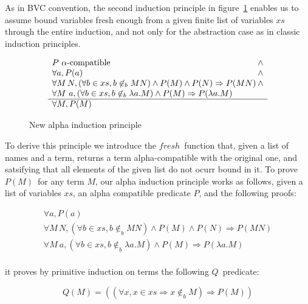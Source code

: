 \documentclass[preprint,10pt]{sigplanconf}
\newcommand{\lam}{\ensuremath{\lambda}}
\newcommand{\ninb}{\ensuremath{\not\in_b}}
\begin{document}
As in BVC convention, the second induction principle in figure~\ref{fig:newalphaind} enables us to assume bound variables fresh enough from a given finite list of variables $xs$ through the entire induction, and not only for the abstraction case as in classic induction principles.

\begin{figure}[h]
\[ 
  \begin{array}{l@{\hspace{0.2em}}c}
    P\ \alpha\text{-compatible} & \wedge \\
    \forall a, P(a) & \wedge\\
    \forall M\,N, (\forall b \in xs, b \ninb M N) \wedge P(M) \wedge P(N) \Rightarrow P (M N) & \wedge \\    
    \forall M\ a, (\forall b \in xs, b \ninb \lam a . M) \wedge P(M) \Rightarrow P (\lam a . M) \\
    \hline
    \forall M, P(M)\\
  \end{array}
\]
  \caption{New alpha induction principle}
  \label{fig:newalphaind}
\end{figure}


To derive this principle we introduce the $fresh$\ function that, given a list of names and a term, returns a term alpha-compatible with the original one, and satsifying that all elements of the given list do not ocurr bound in it. To prove $P(M)$\ for any term $M$, our alpha induction principle  works as follows, given a list of variables $xs$, an alpha compatible predicate $P$, and the following proofs:


\begin{equation}
  \label{eq:hypothesis}
  \begin{array}{l}
    \forall a, P(a) \\
    \forall M\,N, (\forall b \in xs, b \ninb M N) \wedge P(M) \wedge P(N) \Rightarrow P (M N) \\
    \forall M\ a, (\forall b \in xs, b \ninb \lam a . M) \wedge P(M) \Rightarrow P (\lam a . M) \\
  \end{array}
\end{equation}

\noindent it proves by primitive induction on terms the following $Q$\ predicate:

\begin{equation}
  \label{eq:prop}
 Q(M) = \left( (\forall x,x  \in xs \Rightarrow x \ninb M) \Rightarrow P(M)  \right)
\end{equation}
\end{document}
